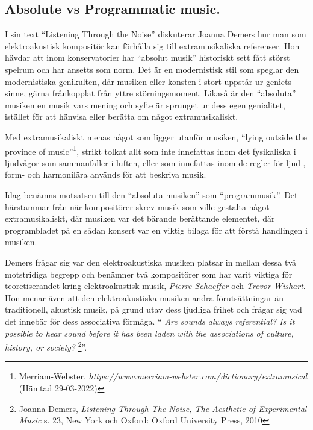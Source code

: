 \documentclass{article}
\begin{document}



\subsection{Absolute vs Programmatic music.}
I sin text ``Listening Through the Noise'' diskuterar Joanna Demers hur man som elektroakustisk kompositör kan
förhålla sig till extramusikaliska referenser. Hon hävdar att inom konservatorier har ``absolut musik''
historiskt sett fått störst spelrum och har ansetts som norm. Det är en modernistisk stil som speglar den
modernistiska genikulten, där musiken eller konsten i stort uppstår ur geniets sinne, gärna frånkopplat från
yttre störningsmoment. Likaså är den ``absoluta'' musiken en musik vars mening och syfte är sprunget ur dess
egen genialitet, istället för att hänvisa eller berätta om något extramusikaliskt.

Med extramusikaliskt menas något som ligger utanför musiken, ``lying outside the province of
music''\footnote{Merriam-Webster, \emph{https://www.merriam-webster.com/dictionary/extramusical} (Hämtad
29-03-2022)}, strikt tolkat allt som inte innefattas inom det fysikaliska i ljudvågor som sammanfaller i
luften, eller som innefattas inom de regler för ljud-, form- och harmonilära används för att beskriva musik. 

Idag benämns motsatsen till den ``absoluta musiken'' som ``programmusik''. Det härstammar från när
kompositörer skrev musik som ville gestalta något extramusikaliskt, där musiken var det bärande berättande elementet, där programbladet på en sådan konsert var en viktig bilaga
för att förstå handlingen i musiken. 

Demers frågar sig var den elektroakustiska musiken platsar in mellan dessa två motstridiga begrepp och
benämner två kompositörer som har varit viktiga för teoretiserandet kring elektroakustisk musik, \emph{Pierre
Schaeffer} och \emph{Trevor Wishart}. Hon menar även att den elektroakustiska musiken andra förutsättningar än
traditionell, akustisk musik, på grund utav dess ljudliga frihet och frågar sig
vad det innebär för dess associativa förmåga. ``
\emph{Are sounds always referential? Is it possible to hear sound before it has been laden with the
associations of culture, history, or society?}
\footnote{Joanna Demers, \emph{Listening Through The Noise, The Aesthetic of Experimental Music} s. 23, New
York och Oxford: Oxford University Press, 2010}''.
\end{document}
